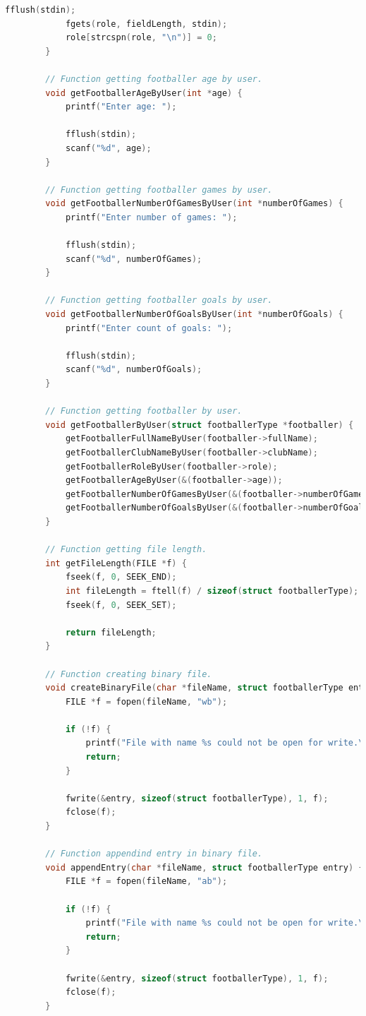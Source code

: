 \documentclass[12pt]{article}
\begin{document}
\begin{lstlisting}[language=C]
			fflush(stdin);
			fgets(role, fieldLength, stdin);
			role[strcspn(role, "\n")] = 0;
		}
		
		// Function getting footballer age by user.
		void getFootballerAgeByUser(int *age) {
			printf("Enter age: ");
			
			fflush(stdin);
			scanf("%d", age);
		}
		
		// Function getting footballer games by user.
		void getFootballerNumberOfGamesByUser(int *numberOfGames) {
			printf("Enter number of games: ");
			
			fflush(stdin);
			scanf("%d", numberOfGames);
		}
		
		// Function getting footballer goals by user.
		void getFootballerNumberOfGoalsByUser(int *numberOfGoals) {
			printf("Enter count of goals: ");
			
			fflush(stdin);
			scanf("%d", numberOfGoals);
		}
		
		// Function getting footballer by user.
		void getFootballerByUser(struct footballerType *footballer) {
			getFootballerFullNameByUser(footballer->fullName);
			getFootballerClubNameByUser(footballer->clubName);
			getFootballerRoleByUser(footballer->role);
			getFootballerAgeByUser(&(footballer->age));
			getFootballerNumberOfGamesByUser(&(footballer->numberOfGames));
			getFootballerNumberOfGoalsByUser(&(footballer->numberOfGoals));
		}
		
		// Function getting file length.
		int getFileLength(FILE *f) {
			fseek(f, 0, SEEK_END);
			int fileLength = ftell(f) / sizeof(struct footballerType);
			fseek(f, 0, SEEK_SET);
			
			return fileLength;
		}
		
		// Function creating binary file.
		void createBinaryFile(char *fileName, struct footballerType entry) {
			FILE *f = fopen(fileName, "wb");
			
			if (!f) {
				printf("File with name %s could not be open for write.\n", fileName);
				return;
			}
			
			fwrite(&entry, sizeof(struct footballerType), 1, f);
			fclose(f);
		}
		
		// Function appendind entry in binary file.
		void appendEntry(char *fileName, struct footballerType entry) {
			FILE *f = fopen(fileName, "ab");
			
			if (!f) {
				printf("File with name %s could not be open for write.\n", fileName);
				return;
			}
			
			fwrite(&entry, sizeof(struct footballerType), 1, f);
			fclose(f);
		}
		

\end{lstlisting}
\end{document}
